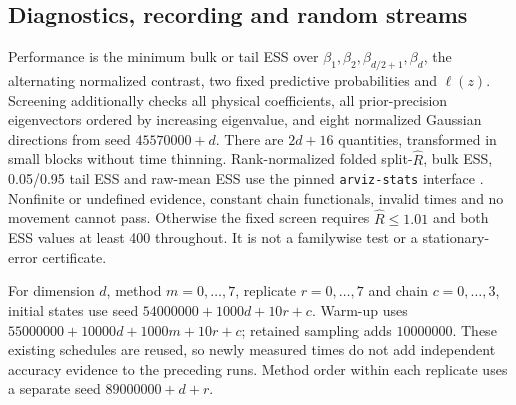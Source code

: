 \documentclass[11pt]{article}
\theoremstyle{definition}\newtheorem{definition}[theorem]{Definition}
\theoremstyle{remark}\newtheorem{remark}[theorem]{Remark}
\numberwithin{equation}{section}
\newcommand{\1}{\mathbf 1}
\begin{document}
\subsection{Diagnostics, recording and random streams}
Performance is the minimum bulk or tail ESS over $\beta_1,\beta_2,\beta_{d/2+1},\beta_d$, the alternating normalized contrast, two fixed predictive probabilities and $\ell(z)$. Screening additionally checks all physical coefficients, all prior-precision eigenvectors ordered by increasing eigenvalue, and eight normalized Gaussian directions from seed $45570000+d$. There are $2d+16$ quantities, transformed in small blocks without time thinning. Rank-normalized folded split-$\widehat R$, bulk ESS, 0.05/0.95 tail ESS and raw-mean ESS use the pinned \texttt{arviz-stats} interface \citep{vehtari}. Nonfinite or undefined evidence, constant chain functionals, invalid times and no movement cannot pass. Otherwise the fixed screen requires $\widehat R\le1.01$ and both ESS values at least 400 throughout. It is not a familywise test or a stationary-error certificate.

For dimension $d$, method $m=0,\ldots,7$, replicate $r=0,\ldots,7$ and chain $c=0,\ldots,3$, initial states use seed $54000000+1000d+10r+c$. Warm-up uses $55000000+10000d+1000m+10r+c$; retained sampling adds $10000000$. These existing schedules are reused, so newly measured times do not add independent accuracy evidence to the preceding runs. Method order within each replicate uses a separate seed $89000000+d+r$.
\end{document}
